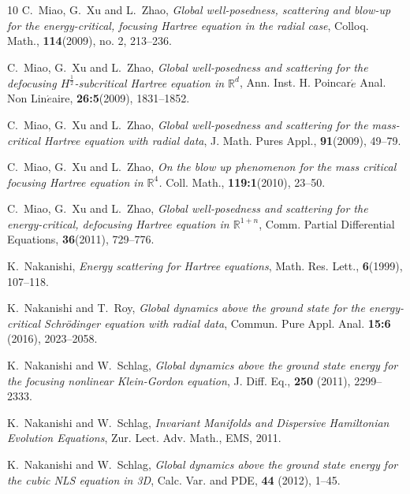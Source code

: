 \documentclass[reqno, 11pt]{amsart}
\numberwithin{equation}{section}
\newcommand{\R}{\mathbb{R}}
\theoremstyle{plain}
\theoremstyle{definition}
\numberwithin{equation}{section}
\numberwithin{theorem}{section}
\numberwithin{equation}{section}
\numberwithin{equation}{section}
\numberwithin{theorem}{section}
\begin{document}
\begin{thebibliography}{10}
		C.~Miao, G.~Xu and L.~Zhao, \emph{Global well-posedness, scattering and blow-up for the energy-critical, focusing Hartree equation in the radial case}, Colloq. Math., \textbf{114}(2009), no. 2, 213--236.
		
		C.~Miao, G.~Xu and L.~Zhao, \emph{Global well-posedness and scattering for the defocusing $H^{\frac{1}{2}}$-subcritical Hartree equation in $\R^d$}, Ann. Inst. H. Poincar$\acute{e}$ Anal. Non Lin$\acute{e}$aire, \textbf{26:5}(2009), 1831--1852.	
		
		C.~Miao, G.~Xu and L.~Zhao, \emph{Global well-posedness and scattering for the mass-critical Hartree equation with radial data}, J. Math. Pures Appl., \textbf{91}(2009), 49--79.	
		
		C.~Miao, G.~Xu and L.~Zhao, \emph{On the blow up phenomenon for the mass critical focusing Hartree equation in $\R^4$.} Coll. Math., \textbf{119:1}(2010), 23--50.
		
		C.~Miao, G.~Xu and L.~Zhao, \emph{Global well-posedness and scattering for the energy-critical, defocusing Hartree equation in $\R^{1+n}$}, Comm. Partial Differential Equations, \textbf{36}(2011), 729--776.
		
		K.~Nakanishi, \emph{Energy scattering for Hartree equations}, Math. Res. Lett., \textbf{6}(1999), 107--118.
		
		
		K.~Nakanishi and T.~Roy, \emph{Global dynamics above the ground state for the energy-critical Schr\"odinger equation with radial data}, Commun. Pure Appl. Anal. \textbf{15:6} (2016), 2023--2058. 
		
		K.~Nakanishi and W.~Schlag, \emph{Global dynamics above the ground state energy for the focusing nonlinear Klein-Gordon equation}, J. Diff. Eq., \textbf{250} (2011), 2299--2333.
		
		K.~Nakanishi and W.~Schlag, \emph{Invariant Manifolds and Dispersive Hamiltonian Evolution Equations}, Zur. Lect. Adv. Math., EMS, 2011.
		
		K.~Nakanishi and W.~Schlag, \emph{Global dynamics above the ground state energy for the cubic NLS equation in 3D}, Calc. Var. and PDE, \textbf{44} (2012), 1--45.
		

\end{thebibliography}
\end{document}
